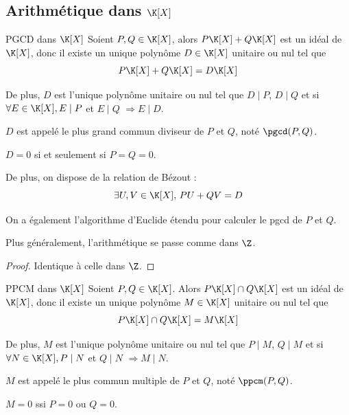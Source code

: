 \subsection{Arithmétique dans \texorpdfstring{$\K [X]$}{K[X]}}

\begin{theoreme}{PGCD dans $\K[X]$}{}
    Soient $P, Q \in \K[X]$, alors $P\K[X] + Q \K[X] $ est un idéal de $\K[X]$, 
    donc il existe un unique polynôme $D \in \K[X]$ unitaire ou nul tel que
    \[P \K[X] + Q \K[X] = D \K[X]\]

    De plus, $D$ est l'unique polynôme unitaire ou nul tel que 
    $D \mid P$, $D \mid Q$ et si $\forall E \in \K[X], E \mid P$ et $E \mid Q$ $\Rightarrow E \mid D$.

    $D$ est appelé le plus grand commun diviseur de $P$ et $Q$, noté $\pgcd(P, Q)$.
\end{theoreme}

\begin{remarque}
    $D = 0$ si et seulement si $P = Q = 0$.

    De plus, on dispose de la relation de Bézout :
    \[\exists U, V \in \K[X], \, PU + QV = D\]

    On a également l'algorithme d'Euclide étendu pour calculer le pgcd de $P$ et $Q$.

    Plus généralement, l'arithmétique se passe comme dans $\Z$.
\end{remarque}

\begin{proof}
    Identique à celle dans $\Z$. 
\end{proof}

\begin{theoreme}{PPCM dans $\K[X]$}{}
    Soient $P, Q \in \K[X]$. Alors $P\K[X] \cap Q \K[X]$ est un idéal de 
    $\K[X]$, donc il existe un unique polynôme $M \in \K[X]$ unitaire ou nul tel que
    \[P \K[X] \cap Q \K[X] = M \K[X]\]

    De plus, $M$ est l'unique polynôme unitaire ou nul tel que
    $P \mid M$, $Q \mid M$ et si $\forall N \in \K[X], P \mid N$ et $Q \mid N$ $\Rightarrow M \mid N$.

    $M$ est appelé le plus commun multiple de $P$ et $Q$, noté $\ppcm(P,Q)$. 
\end{theoreme}

\begin{remarque}
    $M = 0$ ssi $P = 0$ ou $Q = 0$.
\end{remarque}

